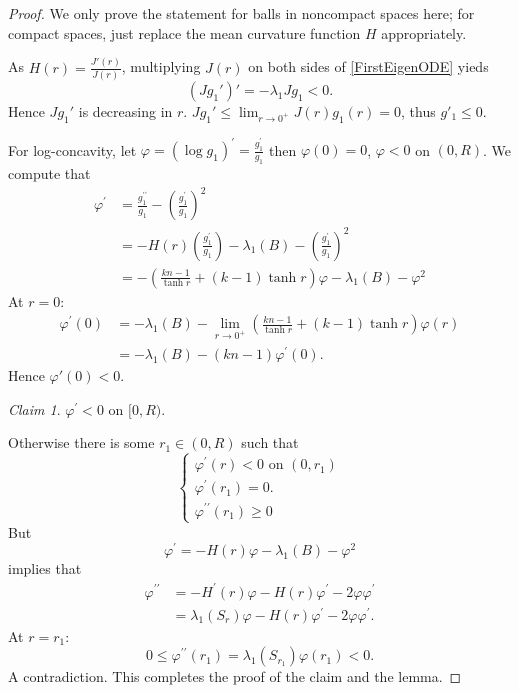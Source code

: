\documentclass{amsart}
\numberwithin{equation}{section}
\theoremstyle{plain}
\theoremstyle{definition}
\theoremstyle{remark}
\newtheorem*{claim}{Claim}
\begin{document}
\begin{proof}
    We only prove the statement for balls in noncompact spaces here; for compact spaces, just replace the mean curvature function $H$ appropriately. 
    \par As $H(r) = \frac{J'(r)}{J(r)}$, multiplying $J(r)$ on both sides of \cref{FirstEigenODE} yieds
    \[\left( J g_1'\right)' = -\lambda_1 Jg_1<0.\] Hence $Jg_1'$ is decreasing in $r$. $Jg_1'\leq \lim_{r\to 0^+} J(r)g_1(r)= 0$, thus $g'_1 \leq 0$.
    \par For log-concavity, let $\varphi=\left(\log g_1\right)^{\prime}=\frac{g_1^{\prime}}{g_1}$ then $\varphi(0)=0$, $\varphi<0$ on $(0, R)$. We compute that
    \[\begin{aligned}
\varphi^{\prime} & =\frac{g_1^{\prime \prime}}{g_1}-\left(\frac{g_1^{\prime}}{g_1}\right)^2\\
&=-H(r)\left(\frac{g_1^{\prime}}{g_1}\right)-\lambda_1(B)-\left(\frac{g_1^{\prime}}{g_1}\right)^2 \\
& =-\left(\frac{kn-1}{\tanh r}+(k-1) \tanh r\right) \varphi-\lambda_1(B)-\varphi^2
\end{aligned}\] At $r=0:$
\[\begin{aligned}
     \varphi^{\prime}(0) &=-\lambda_1(B)-\lim _{r \rightarrow 0^{+}}\left(\frac{kn-1}{\tanh r}+(k-1) \tanh r\right) \varphi(r)\\
    &=-\lambda_1(B)-(k n-1) \varphi^{\prime}(0) .
\end{aligned}\]
Hence $\varphi'(0)<0.$ 
\begin{claim}
  $\varphi^{\prime}<0$ on $[0, R).$  
\end{claim}
Otherwise there is some $r_1\in (0,R)$ such that
\begin{equation*}
\left\{\begin{array}{l}
\varphi^{\prime}(r)<0 \text { on } (0,r_1)\\
\varphi^{\prime}\left(r_1\right)=0 . \\
\varphi^{\prime \prime}\left(r_1\right) \geqslant 0
\end{array}\right.
\end{equation*}
But \[\varphi^{\prime}=-H(r) \varphi-\lambda_1(B)-\varphi^2\] implies that
\[\begin{aligned}
\varphi^{\prime \prime} & =-H^{\prime}(r) \varphi-H(r) \varphi^{\prime}-2 \varphi \varphi^{\prime} \\
& =\lambda_1\left(S_r\right) \varphi-H(r) \varphi^{\prime}-2 \varphi \varphi^{\prime} .
\end{aligned}\]
At $r=r_1$: \[0 \leq \varphi^{\prime \prime}\left(r_1\right)=\lambda_1\left(S_{r_1}\right) \varphi\left(r_1\right)<0.\] 
A contradiction. This completes the proof of the claim and the lemma.

\end{proof}
\end{document}
